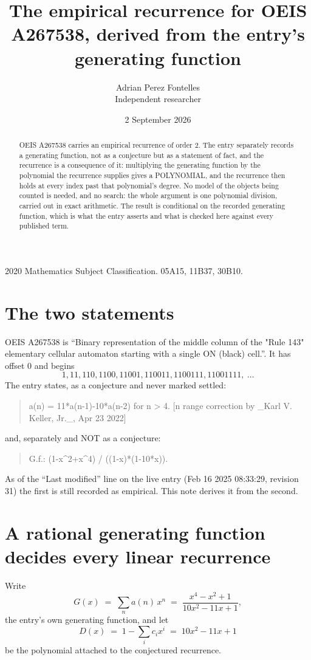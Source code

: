 \documentclass[11pt,a4paper]{article}
\title{The empirical recurrence for OEIS A267538, derived from the entry's generating function}
\author{Adrian Perez Fontelles\\ \small Independent researcher}
\date{2 September 2026}
\theoremstyle{plain}
\theoremstyle{definition}
\begin{document}
\maketitle

\begin{abstract}
OEIS A267538 carries an empirical recurrence of order $2$. The entry separately records a
generating function, not as a conjecture but as a statement of fact, and the recurrence is a
consequence of it: multiplying the generating function by the polynomial the recurrence
supplies gives a POLYNOMIAL, and the recurrence then holds at every index past that
polynomial's degree. No model of the objects being counted is needed, and no search: the
whole argument is one polynomial division, carried out in exact arithmetic. The result is
conditional on the recorded generating function, which is what the entry asserts and what is
checked here against every published term.
\end{abstract}

\noindent\small 2020 Mathematics Subject Classification. 05A15, 11B37, 30B10.\normalsize

\section{The two statements}

OEIS A267538 is ``Binary representation of the middle column of the "Rule 143" elementary cellular automaton starting with a single ON (black) cell.''. It has offset $0$ and begins
\[
1, 11, 110, 1100, 11001, 110011, 1100111, 11001111,\ \dots
\]
The entry states, as a conjecture and never marked settled:
\begin{quote}
a(n) = 11*a(n-1)-10*a(n-2) for n > 4. [n range correction by \_Karl V. Keller, Jr.\_, Apr 23 2022]
\end{quote}
and, separately and NOT as a conjecture:
\begin{quote}
G.f.: (1-x\^{}2+x\^{}4) / ((1-x)*(1-10*x)).
\end{quote}
As of the ``Last modified'' line on the live entry (Feb 16 2025 08:33:29, revision 31) the first is still
recorded as empirical. This note derives it from the second.

\section{A rational generating function decides every linear recurrence}

Write
\[
G(x)\;=\;\sum_{n}a(n)\,x^{n}\;=\;\frac{x^{4} - x^{2} + 1}{10 x^{2} - 11 x + 1},
\]
the entry's own generating function, and let
\[
D(x)\;=\;1-\sum_i c_i x^{i}\;=\;10 x^{2} - 11 x + 1
\]
be the polynomial attached to the conjectured recurrence.
\end{document}
